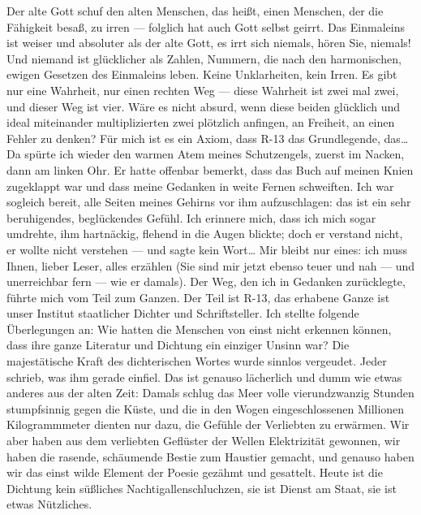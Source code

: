 Der alte Gott schuf den alten Menschen, das heißt, einen Menschen,
der die Fähigkeit besaß, zu irren — folglich hat auch Gott selbst
geirrt. Das Einmaleins ist weiser und absoluter als der alte Gott,
es irrt sich niemals, hören Sie, niemals! Und niemand ist
glücklicher als Zahlen, Nummern, die nach den harmonischen, ewigen
Gesetzen des Einmaleins leben. Keine Unklarheiten, kein Irren. Es
gibt nur eine Wahrheit, nur einen rechten Weg — diese Wahrheit ist
zwei mal zwei, und dieser Weg ist vier. Wäre es nicht absurd, wenn
diese beiden glücklich und ideal miteinander multiplizierten zwei
plötzlich anfingen, an Freiheit, an einen Fehler zu denken? Für
mich ist es ein Axiom, dass R-13 das Grundlegende, das\ldots{} Da spürte
ich wieder den warmen Atem meines Schutzengels, zuerst im Nacken,
dann am linken Ohr. Er hatte offenbar bemerkt, dass das Buch auf
meinen Knien zugeklappt war und dass meine Gedanken in weite Fernen
schweiften. Ich war sogleich bereit, alle Seiten meines Gehirns vor
ihm aufzuschlagen: das ist ein sehr beruhigendes, beglückendes
Gefühl. Ich erinnere mich, dass ich mich sogar umdrehte, ihm
hartnäckig, flehend in die Augen blickte; doch er verstand nicht,
er wollte nicht verstehen — und sagte kein Wort\ldots{} Mir bleibt nur
eines: ich muss Ihnen, lieber Leser, alles erzählen (Sie sind mir
jetzt ebenso teuer und nah — und unerreichbar fern — wie er
damals). Der Weg, den ich in Gedanken zurücklegte, führte mich
vom Teil zum Ganzen. Der Teil ist R-13, das erhabene Ganze ist
unser Institut staatlicher Dichter und Schriftsteller. Ich stellte
folgende Überlegungen an: Wie hatten die Menschen von einst nicht
erkennen können, dass ihre ganze Literatur und Dichtung ein
einziger Unsinn war? Die majestätische Kraft des dichterischen
Wortes wurde sinnlos vergeudet. Jeder schrieb, was ihm gerade
einfiel. Das ist genauso lächerlich und dumm wie etwas anderes aus
der alten Zeit: Damals schlug das Meer volle vierundzwanzig Stunden
stumpfsinnig gegen die Küste, und die in den Wogen eingeschlossenen
Millionen Kilogrammmeter dienten nur dazu, die Gefühle der
Verliebten zu erwärmen. Wir aber haben aus dem verliebten Geflüster
der Wellen Elektrizität gewonnen, wir haben die rasende, schäumende
Bestie zum Haustier gemacht, und genauso haben wir das einst wilde
Element der Poesie gezähmt und gesattelt. Heute ist die Dichtung
kein süßliches Nachtigallenschluchzen, sie ist Dienst am Staat, sie
ist etwas Nützliches.

